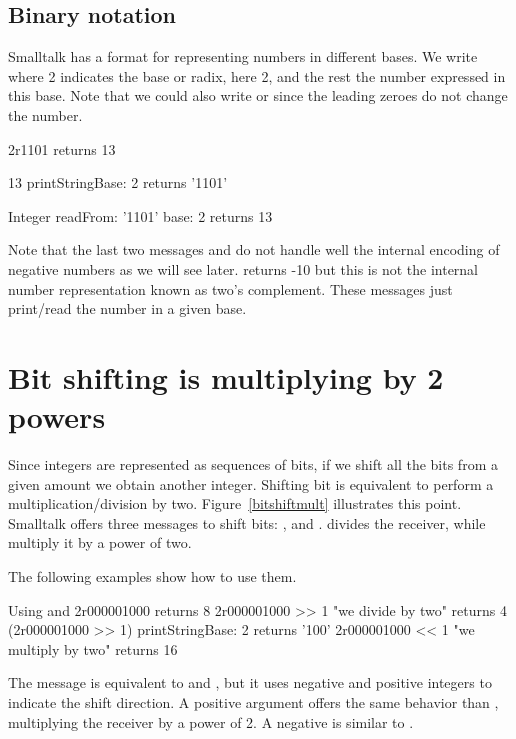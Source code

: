 \documentclass[a4paper,10pt,twoside]{book}
\begin{document}
\subsection*{Binary notation}
Smalltalk has a format for representing numbers in different bases. We write  where 2 indicates the base or radix, here 2, and the rest the number expressed in this base. Note that we could also write  or  since the leading zeroes do not change the number.
\begin{code}{}
2r1101
	returns 13

13 printStringBase: 2
	returns '1101'
	
Integer readFrom: '1101' base: 2 	
	returns 13
\end{code}

Note that the last two messages  and  do not handle well the internal encoding of negative numbers as we will see later.  returns -10 but this is not the internal number representation known as two's complement. These messages just print/read the number in a given base. 



\section{Bit shifting is multiplying by 2 powers}

Since integers are represented as sequences of bits, if we shift all the bits from a given amount we obtain another integer. Shifting bit is equivalent to perform a multiplication/division by two. Figure~\ref{bitshiftmult} illustrates this point. Smalltalk offers three messages to shift bits: ,  and . \ct{>>} divides the receiver, while \ct{<<} multiply it by a power of two.

The following examples show how to use them.


\begin{code}{Using \ct{>>} and \ct{<<}}
2r000001000 
	returns 8
2r000001000 >> 1					"we divide by two"
	returns 4
(2r000001000 >> 1) printStringBase: 2 	
	returns '100'
2r000001000 << 1					"we multiply by two"
	returns 16
\end{code}

The message  is equivalent to \ct{>>} and \ct{<<}, but it uses negative and positive integers to indicate the shift direction. A positive argument offers the same behavior than \ct{<<}, multiplying the receiver by a power of 2. A negative is similar to \ct{>>}. 
\end{document}
